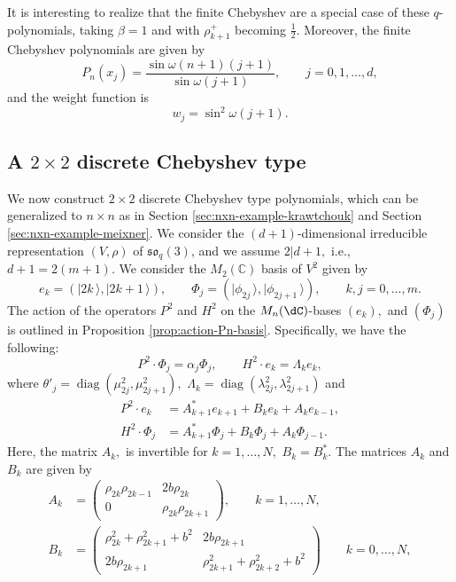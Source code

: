 \documentclass[a4paper,reqno]{amsart}
\DeclareMathOperator{\diag}{diag}
\theoremstyle{definition}
\numberwithin{equation}{section}
\newcommand{\ket}[1]{\mid{#1}\,\rangle}
\begin{document}
It is interesting to realize that the finite Chebyshev are a special case of these
$q$-polynomials, taking $\beta=1$ and with $\rho_{k+1}^+$ becoming $\frac{1}{2}$. Moreover, the finite Chebyshev polynomials are given by
\begin{equation}
    P_n(x_j)=\frac{\sin \omega (n+1)(j+1)}{\sin \omega (j+1)}, \qquad j=0,1,\ldots, d,
\end{equation}
and the weight function is 
\begin{equation}
    w_j=\sin^2 \omega(j + 1).
\end{equation}

\subsection{A $2\times 2$ discrete Chebyshev type}
We now construct $2\times 2$ discrete Chebyshev type polynomials, which can be generalized to $n\times n$ as in Section \ref{sec:nxn-example-krawtchouk} and Section \ref{sec:nxn-example-meixner}. We consider the $(d+1)$-dimensional irreducible representation $(V,\rho)$ of $\mathfrak{so}_q(3)$, and we assume $2|d+1,$ i.e., $d+1=2(m+1).$ 
We consider the $M_2(\mathbb{C})$ basis of $V^2$ given by 
\begin{equation}
    e_k=(\ket{2k},\ket{2k+1}), \qquad \Phi_j=(\ket{\phi_{2j}}, \ket{\phi_{2j+1}}), \qquad k,j=0,\ldots,m.
\end{equation}
The action of the operators $P^2$ and $H^2$ on the $M_n(\dC)$-bases $(e_k),$ and $(\Phi_j)$ is outlined in Proposition \ref{prop:action-Pn-basis}. Specifically, we have the following:
\begin{equation}
    P^2\cdot \Phi_j = \alpha_j \Phi_j,\qquad H^2\cdot e_k=\Lambda_k e_k,
\end{equation}
where $\theta'_j=\diag(\mu_{2j}^2,\mu_{2j+1}^2 ),$ $\Lambda_k=\diag(\lambda_{2j}^2, \lambda_{2j+1}^2 )$ and
\begin{align}
 P^2\cdot e_k&=A_{k+1}^\ast e_{k+1} + B_k e_k +A_k e_{k-1},\\
 H^2\cdot \Phi_j &= A_{k+1}^\ast\Phi_j+B_k\Phi_j+A_k\Phi_{j-1}.
\end{align}
Here, the matrix $A_k,$ is invertible for $k=1,\ldots,N,$ $B_k=B_k^\ast.$ The matrices $A_k$ and $B_k$ are given by
\begin{align}
A_{k}&= \begin{pmatrix}
\rho_{2 k} \rho_{2 k-1} & 2b\rho_{2 k}
\\
0 & \rho_{2 k}\rho_{2 k +1}
\end{pmatrix}, \qquad k=1,\ldots,N,
\\
B_k&=\begin{pmatrix}
 \rho_{2 k}^2 + \rho _{2 k+1}^2 +b^{2}& 2b\rho_{2 k+1} 
\\
 2b\rho_{2 k+1} &  \rho_{2 k +1}^2+ \rho_{2 k+2}^2+b^{2}
\end{pmatrix}\qquad k=0,\ldots,N,
\end{align}
\end{document}
